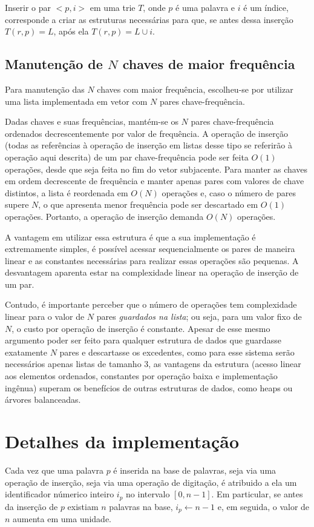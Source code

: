 \documentclass[12pt]{article}
\begin{document}
    Inserir o par $<p, i>$ em uma trie $T$, onde $p$ é uma palavra e $i$ é um índice, corresponde a criar as estruturas necessárias para que, se antes dessa inserção $T(r, p) = L$, após ela $T(r, p) = L \cup i$.

    \subsection{Manutenção de $N$ chaves de maior frequência} \label{sec:list}
    Para manutenção das $N$ chaves com maior frequência, escolheu-se por utilizar uma lista implementada em vetor com $N$ pares chave-frequência.

    Dadas chaves e suas fre\-quên\-cias, mantém-se os $N$ pares chave-frequência ordenados decrescentemente por valor de frequência.
    A operação de inserção (todas as referências à operação de inserção em listas desse tipo se referirão à operação aqui descrita) de um par chave-frequência pode ser feita $O(1)$ operações, desde que seja feita no fim do vetor subjacente.
    Para manter as chaves em ordem decrescente de frequência e manter apenas pares com valores de chave distintos, a lista é reordenada em $O(N)$ operações e, caso o número de pares supere $N$, o que apresenta menor frequência pode ser descartado em $O(1)$ operações.
    Portanto, a operação de inserção demanda $O(N)$ operações.

    A vantagem em utilizar essa estrutura é que a sua implementação é extremamente simples, é possível acessar sequencialmente os pares de maneira linear e as constantes necessárias para realizar essas operações são pequenas.
    A desvantagem aparenta estar na complexidade linear na operação de inserção de um par.

    Contudo, é importante perceber que o número de operações tem complexidade linear para o valor de $N$ pares \emph{guardados na lista}; ou seja, para um valor fixo de $N$, o custo por operação de inserção é constante.
    Apesar de esse mesmo argumento poder ser feito para qualquer estrutura de dados que guardasse exatamente $N$ pares e descartasse os excedentes, como para esse sistema serão necessários apenas listas de tamanho 3, as vantagens da estrutura (acesso linear aos elementos ordenados, constantes por operação baixa e implementação ingênua) superam os benefícios de outras estruturas de dados, como heaps ou árvores balanceadas.

  \section{Detalhes da implementação}
    Cada vez que uma palavra $p$ é inserida na base de palavras, seja via uma operação de inserção, seja via uma operação de digitação, é atribuido a ela um identificador númerico inteiro $i_p$ no intervalo $[0, n - 1]$.
    Em particular, se antes da inserção de $p$ existiam $n$ palavras na base, $i_p \leftarrow n - 1$ e, em seguida, o valor de $n$ aumenta em uma unidade.
\end{document}
